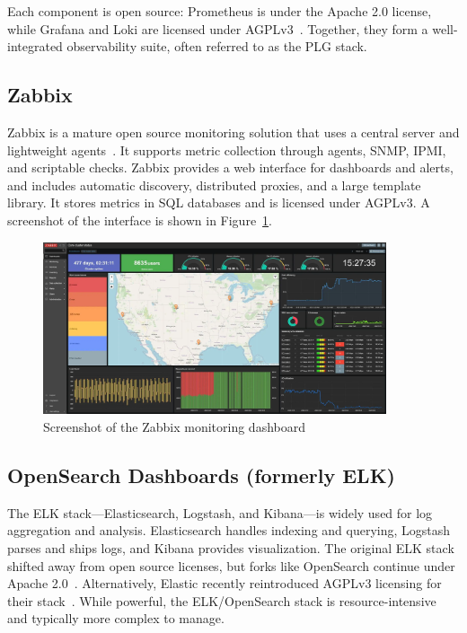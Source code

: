 Each component is open source: Prometheus is under the Apache 2.0 license, while Grafana and Loki are licensed under AGPLv3~\cite{grafana-license-change}. Together, they form a well-integrated observability suite, often referred to as the PLG stack.

\subsection*{Zabbix}
Zabbix is a mature open source monitoring solution that uses a central server and lightweight agents~\cite{zabbix-web}. It supports metric collection through agents, SNMP, IPMI, and scriptable checks. Zabbix provides a web interface for dashboards and alerts, and includes automatic discovery, distributed proxies, and a large template library. It stores metrics in SQL databases and is licensed under AGPLv3. A screenshot of the interface is shown in Figure~\ref{fig:zabbix-ui}.

\begin{figure}[h!]
  \centering
  \includegraphics[width=0.9\textwidth]{imaxes/zabbix-ui.png}
  \caption{Screenshot of the Zabbix monitoring dashboard}
  \label{fig:zabbix-ui}
\end{figure}

\subsection*{OpenSearch Dashboards (formerly ELK)}
The ELK stack—Elasticsearch, Logstash, and Kibana—is widely used for log aggregation and analysis. Elasticsearch handles indexing and querying, Logstash parses and ships logs, and Kibana provides visualization. The original ELK stack shifted away from open source licenses, but forks like OpenSearch continue under Apache 2.0~\cite{opensearch-web}. Alternatively, Elastic recently reintroduced AGPLv3 licensing for their stack~\cite{elastic-license}. While powerful, the ELK/OpenSearch stack is resource-intensive and typically more complex to manage.

